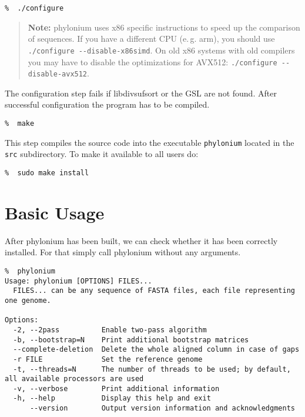 \documentclass[a4paper,10pt,english]{scrartcl}
\newcommand{\tool}[1]{\textsf{#1}}
\newcommand{\phylonium}{\textsf{phylonium}\xspace}
\begin{document}
\begin{lstlisting}
%  ./configure
\end{lstlisting}

\begin{quotation}
\textbf{Note:} \phylonium uses x86 specific instructions to speed up the comparison of sequences. If you have a different CPU (e.\,g. arm), you should use \lstinline!./configure --disable-x86simd!. On old x86 systems with old compilers you may have to disable the optimizations for AVX512: \lstinline!./configure --disable-avx512!.
\end{quotation}

The configuration step fails if \tool{libdivsufsort} or the \tool{GSL} are not found. After successful configuration the program has to be compiled.

\begin{lstlisting}
%  make
\end{lstlisting}

This step compiles the source code into the executable \lstinline!phylonium! located in the \lstinline!src! subdirectory. To make it available to all users do:

\begin{lstlisting}
%  sudo make install
\end{lstlisting}


\section{Basic Usage}

After \phylonium has been built, we can check whether it has been correctly installed. For that simply call \phylonium without any arguments.

\begin{lstlisting}
%  phylonium
Usage: phylonium [OPTIONS] FILES...
  FILES... can be any sequence of FASTA files, each file representing one genome.

Options:
  -2, --2pass          Enable two-pass algorithm
  -b, --bootstrap=N    Print additional bootstrap matrices
  --complete-deletion  Delete the whole aligned column in case of gaps
  -r FILE              Set the reference genome
  -t, --threads=N      The number of threads to be used; by default, all available processors are used
  -v, --verbose        Print additional information
  -h, --help           Display this help and exit
      --version        Output version information and acknowledgments
\end{lstlisting}
\end{document}

